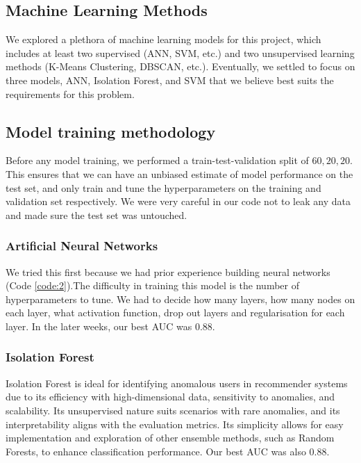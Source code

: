 \documentclass[12pt]{article}
\begin{document}
\subsection{Machine Learning Methods}
We explored a plethora of machine learning models for this project, which includes at least two supervised (ANN, SVM, etc.) and two unsupervised learning methods (K-Means Clustering, DBSCAN, etc.). Eventually, we settled to focus on three models, ANN, Isolation Forest, and SVM that we believe best suits the requirements for this problem.

\subsection{Model training methodology}
Before any model training, we performed a train-test-validation split of $60, 20, 20$. This ensures that we can have an unbiased estimate of model performance on the test set, and only train and tune the hyperparameters on the training and validation set respectively. We were very careful in our code not to leak any data and made sure the test set was untouched.

\subsubsection{Artificial Neural Networks}
We tried this first because we had prior experience building neural networks (Code \ref{code:2}).The difficulty in training this model is the number of hyperparameters to tune. We had to decide how many layers, how many nodes on each layer, what activation function, drop out layers and regularisation for each layer. In the later weeks, our best AUC was 0.88.

\subsubsection{Isolation Forest}
Isolation Forest is ideal for identifying anomalous users in recommender systems due to its efficiency with high-dimensional data, sensitivity to anomalies, and scalability. Its unsupervised nature suits scenarios with rare anomalies, and its interpretability aligns with the evaluation metrics. Its simplicity allows for easy implementation and exploration of other ensemble methods, such as Random Forests, to enhance classification performance. Our best AUC was also 0.88.
\end{document}
